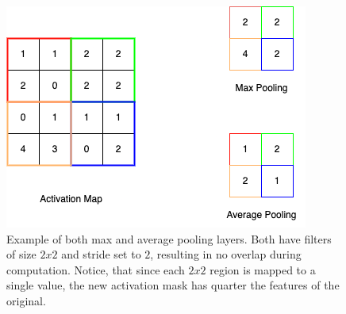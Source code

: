 \begin{figure}[!h]
    \begin{center}
    \begin{minipage}{0.5\textwidth}
      \includegraphics[width=\textwidth]{img/cnn-pool.png}
    \end{minipage}
    \caption{Example of both max and average pooling layers. Both have filters of size $2x2$ and stride set to $2$, resulting in no overlap during computation. Notice, that since each $2x2$ region is mapped to a single value, the new activation mask has quarter the features of the original.}
    \label{fig:cnn-pooling}
    \end{center}
\end{figure}
